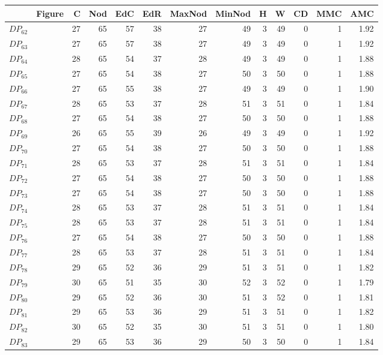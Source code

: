 \documentclass{article}
\begin{document}
\begin{center}
\begin{tabular}{llrrrrrrrrrrr}
\toprule
 & Figure & C & Nod & EdC & EdR & MaxNod & MinNod & H & W & CD & MMC & AMC \\
\midrule
$DP_{62}$ &  & 27 & 65 & 57 & 38 & 27 & 49 & 3 & 49 & 0 & 1 & 1.92 \\
$DP_{63}$ &  & 27 & 65 & 57 & 38 & 27 & 49 & 3 & 49 & 0 & 1 & 1.92 \\
$DP_{64}$ &  & 28 & 65 & 54 & 37 & 28 & 49 & 3 & 49 & 0 & 1 & 1.88 \\
$DP_{65}$ &  & 27 & 65 & 54 & 38 & 27 & 50 & 3 & 50 & 0 & 1 & 1.88 \\
$DP_{66}$ &  & 27 & 65 & 55 & 38 & 27 & 49 & 3 & 49 & 0 & 1 & 1.90 \\
$DP_{67}$ &  & 28 & 65 & 53 & 37 & 28 & 51 & 3 & 51 & 0 & 1 & 1.84 \\
$DP_{68}$ &  & 27 & 65 & 54 & 38 & 27 & 50 & 3 & 50 & 0 & 1 & 1.88 \\
$DP_{69}$ &  & 26 & 65 & 55 & 39 & 26 & 49 & 3 & 49 & 0 & 1 & 1.92 \\
$DP_{70}$ &  & 27 & 65 & 54 & 38 & 27 & 50 & 3 & 50 & 0 & 1 & 1.88 \\
$DP_{71}$ &  & 28 & 65 & 53 & 37 & 28 & 51 & 3 & 51 & 0 & 1 & 1.84 \\
$DP_{72}$ &  & 27 & 65 & 54 & 38 & 27 & 50 & 3 & 50 & 0 & 1 & 1.88 \\
$DP_{73}$ &  & 27 & 65 & 54 & 38 & 27 & 50 & 3 & 50 & 0 & 1 & 1.88 \\
$DP_{74}$ &  & 28 & 65 & 53 & 37 & 28 & 51 & 3 & 51 & 0 & 1 & 1.84 \\
$DP_{75}$ &  & 28 & 65 & 53 & 37 & 28 & 51 & 3 & 51 & 0 & 1 & 1.84 \\
$DP_{76}$ &  & 27 & 65 & 54 & 38 & 27 & 50 & 3 & 50 & 0 & 1 & 1.88 \\
$DP_{77}$ &  & 28 & 65 & 53 & 37 & 28 & 51 & 3 & 51 & 0 & 1 & 1.84 \\
$DP_{78}$ &  & 29 & 65 & 52 & 36 & 29 & 51 & 3 & 51 & 0 & 1 & 1.82 \\
$DP_{79}$ &  & 30 & 65 & 51 & 35 & 30 & 52 & 3 & 52 & 0 & 1 & 1.79 \\
$DP_{80}$ &  & 29 & 65 & 52 & 36 & 30 & 51 & 3 & 52 & 0 & 1 & 1.81 \\
$DP_{81}$ &  & 29 & 65 & 53 & 36 & 29 & 51 & 3 & 51 & 0 & 1 & 1.82 \\
$DP_{82}$ &  & 30 & 65 & 52 & 35 & 30 & 51 & 3 & 51 & 0 & 1 & 1.80 \\
$DP_{83}$ &  & 29 & 65 & 53 & 36 & 29 & 50 & 3 & 50 & 0 & 1 & 1.84 \\

\end{tabular}
\end{center}
\end{document}
